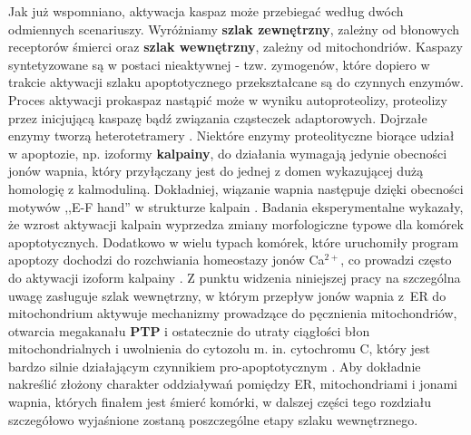 Jak już wspomniano, aktywacja kaspaz może przebiegać według dwóch odmiennych scenariuszy. Wyróżniamy \textbf{szlak zewnętrzny}, zależny od błonowych receptorów śmierci oraz \textbf{szlak wewnętrzny}, zależny od mitochondriów. Kaspazy syntetyzowane są w postaci nieaktywnej - tzw. zymogenów, które dopiero w trakcie aktywacji szlaku apoptotycznego przekształcane są do czynnych enzymów. Proces aktywacji prokaspaz nastąpić może w wyniku autoproteolizy, proteolizy przez inicjującą kaspazę bądź związania cząsteczek adaptorowych. Dojrzałe enzymy tworzą heterotetramery \cite{Klyszejko2002,Nicholson1999}. Niektóre enzymy proteolityczne biorące udział w apoptozie, np. izoformy \textbf{kalpainy}, do działania wymagają jedynie obecności jonów wapnia, który przyłączany jest do jednej z domen wykazującej dużą homologię z kalmoduliną. Dokładniej, wiązanie wapnia następuje dzięki obecności motywów ,,E-F hand'' w strukturze kalpain \cite{Campbell2012,Partha2014}. Badania eksperymentalne wykazały, że wzrost aktywacji kalpain wyprzedza zmiany morfologiczne typowe dla komórek apoptotycznych. Dodatkowo w wielu typach komórek, które uruchomiły program apoptozy dochodzi do rozchwiania homeostazy jonów Ca$^{2+}$, co prowadzi często do aktywacji izoform kalpainy \cite{Goll2003,Smith2012}. Z punktu widzenia niniejszej pracy na szczególna uwagę zasługuje szlak wewnętrzny, w którym przepływ jonów wapnia z~ER do mitochondrium aktywuje mechanizmy prowadzące do pęcznienia mitochondriów, otwarcia megakanału \textbf{PTP} i ostatecznie do utraty ciągłości błon mitochondrialnych i uwolnienia do cytozolu m. in. cytochromu C, który jest bardzo silnie działającym czynnikiem pro-apoptotycznym \cite{Klyszejko2002,Shi2001}. Aby dokładnie nakreślić złożony charakter oddziaływań pomiędzy ER, mitochondriami i jonami wapnia, których finałem jest śmierć komórki, w dalszej części tego rozdziału szczegółowo wyjaśnione zostaną poszczególne etapy szlaku wewnętrznego.

